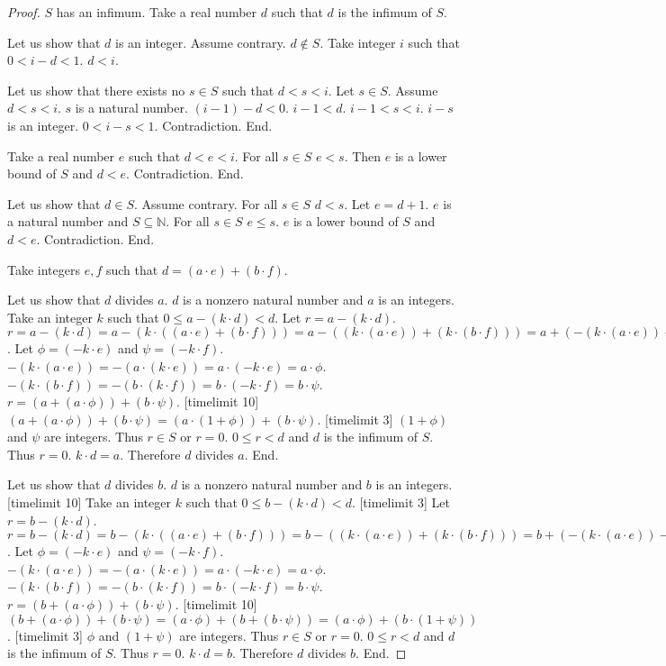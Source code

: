 \documentclass{article}
\begin{document}
\begin{forthel}
\begin{proof}
  $S$ has an infimum.
  Take a real number $d$ such that $d$ is the infimum of $S$.

  Let us show that $d$ is an integer.
    Assume contrary. $d \notin S$. Take integer $i$ such that $0 < i - d < 1$. $d < i$.

    Let us show that there exists no $s \in S$ such that $d < s < i$.
      Let $s \in S$. Assume $d < s < i$. $s$ is a natural number. 
      $(i-1) - d < 0$. $i-1 < d$. $i-1 < s < i$. $i-s$ is an integer. $0 < i-s < 1$. Contradiction. End.

    Take a real number $e$ such that $d < e < i$.
    For all $s \in S$ $e < s$.
    Then $e$ is a lower bound of $S$ and $d < e$. Contradiction. 
  End.
  
  Let us show that $d \in S$.
    Assume contrary. For all $s \in S$ $d < s$. Let $e = d+1$. $e$ is a natural number and $S \subseteq \mathbb{N}$.
    For all $s \in S$ $e \leq s$. $e$ is a lower bound of $S$ and $d < e$. Contradiction. End.

  Take integers $e,f$ such that $d = (a \cdot e) + (b \cdot f)$.

  Let us show that $d$ divides $a$.
    $d$ is a nonzero natural number and $a$ is an integers.
    Take an integer $k$ such that $0 \leq a - (k \cdot d) < d$. Let $r = a - (k \cdot d)$.
    $r = a - (k \cdot d) = a - (k \cdot ((a \cdot e) + (b \cdot f))) 
    = a - ((k \cdot (a \cdot e)) + (k \cdot (b \cdot f)))
    = a + (-(k \cdot (a \cdot e)) - (k \cdot (b \cdot f)))$.
    Let $\phi = (-k \cdot e)$ and $\psi = (-k \cdot f)$.
    $-(k \cdot (a \cdot e)) = -(a \cdot (k \cdot e)) = a \cdot (-k \cdot e) = a \cdot \phi$.
    $- (k \cdot (b \cdot f)) = -(b \cdot (k \cdot f)) = b \cdot (-k \cdot f) = b \cdot \psi$.
    $r = (a + (a \cdot \phi)) + (b \cdot \psi)$. [timelimit 10]
    $(a + (a \cdot \phi)) + (b \cdot \psi)= (a \cdot (1 + \phi)) + (b \cdot \psi)$. [timelimit 3]
    $(1 + \phi)$ and $\psi$ are integers. Thus $r \in S$ or $r = 0$. $0 \leq r < d$ and $d$ is the infimum of $S$.
    Thus $r = 0$. $k \cdot d = a$. Therefore $d$ divides $a$.
  End.

  Let us show that $d$ divides $b$.
    $d$ is a nonzero natural number and $b$ is an integers.
    [timelimit 10] Take an integer $k$ such that $0 \leq b - (k \cdot d) < d$. [timelimit 3] Let $r = b - (k \cdot d)$.
    $r = b - (k \cdot d) = b - (k \cdot ((a \cdot e) + (b \cdot f))) 
    = b - ((k \cdot (a \cdot e)) + (k \cdot (b \cdot f)))
    = b + (-(k \cdot (a \cdot e)) - (k \cdot (b \cdot f)))$.
    Let $\phi = (-k \cdot e)$ and $\psi = (-k \cdot f)$.
    $-(k \cdot (a \cdot e)) = -(a \cdot (k \cdot e)) = a \cdot (-k \cdot e) = a \cdot \phi$.
    $- (k \cdot (b \cdot f)) = -(b \cdot (k \cdot f)) = b \cdot (-k \cdot f) = b \cdot \psi$.
    $r = (b + (a \cdot \phi)) + (b \cdot \psi)$. [timelimit 10]
    $(b + (a \cdot \phi)) + (b \cdot \psi) = (a \cdot \phi) + (b + (b \cdot \psi)) = (a \cdot \phi) + (b \cdot (1 + \psi))$. [timelimit 3]
    $\phi$ and $(1+\psi)$ are integers. Thus $r \in S$ or $r = 0$. $0 \leq r < d$ and $d$ is the infimum of $S$.
    Thus $r = 0$. $k \cdot d = b$. Therefore $d$ divides $b$.
  End.



\end{proof}
\end{forthel}
\end{document}
